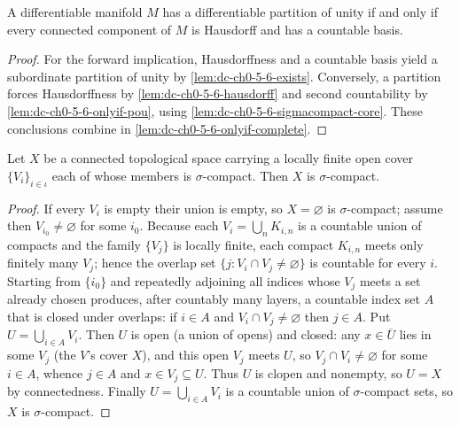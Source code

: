 \begin{theorem}
  \label{thm:dc-ch0-5-6}

  A differentiable manifold $M$ has a differentiable partition of unity if and only
  if every connected component of $M$ is Hausdorff and has a countable basis.
\end{theorem}
\begin{proof}
  \sketch
  For the forward implication, Hausdorffness and a countable basis yield a subordinate
  partition of unity by \cref{lem:dc-ch0-5-6-exists}. Conversely, a partition forces
  Hausdorffness by \cref{lem:dc-ch0-5-6-hausdorff} and second countability by
  \cref{lem:dc-ch0-5-6-onlyif-pou}, using
  \cref{lem:dc-ch0-5-6-sigmacompact-core}. These conclusions combine in
  \cref{lem:dc-ch0-5-6-onlyif-complete}.
\end{proof}

\begin{lemma}
  \label{lem:dc-ch0-5-6-sigmacompact-core}


  Let $X$ be a connected topological space carrying a locally finite open cover
  $\{V_i\}_{i\in\iota}$ each of whose members is $\sigma$-compact. Then $X$ is
  $\sigma$-compact.
\end{lemma}
\begin{proof}
  \sketch

  If every $V_i$ is empty their union is empty, so $X=\varnothing$ is
  $\sigma$-compact; assume then $V_{i_0}\neq\varnothing$ for some $i_0$. Because each
  $V_i=\bigcup_n K_{i,n}$ is a countable union of compacts and the family
  $\{V_j\}$ is locally finite, each compact $K_{i,n}$ meets only finitely many
  $V_j$; hence the overlap set $\{j : V_i\cap V_j\neq\varnothing\}$ is countable for
  every $i$.
  Starting from $\{i_0\}$ and repeatedly adjoining all indices whose $V_j$ meets a
  set already chosen produces, after countably many layers, a countable index set
  $A$ that is closed under overlaps: if $i\in A$ and $V_i\cap V_j\neq\varnothing$
  then $j\in A$. Put $U=\bigcup_{i\in A}V_i$. Then $U$ is open (a union of opens) and
  closed: any $x\in\overline U$ lies in some $V_j$ (the $V$'s cover $X$), and this
  open $V_j$ meets $U$, so $V_j\cap V_i\neq\varnothing$ for some $i\in A$, whence
  $j\in A$ and $x\in V_j\subseteq U$. Thus $U$ is clopen and nonempty, so $U=X$ by
  connectedness. Finally $U=\bigcup_{i\in A}V_i$ is a countable union of
  $\sigma$-compact sets, so $X$ is $\sigma$-compact.
\end{proof}

